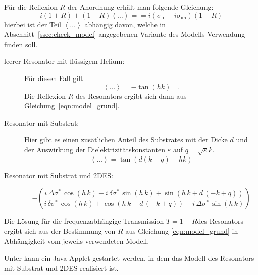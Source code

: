 Für die Reflexion $R$ der Anordnung erhält man folgende Gleichung:
\begin{equation}
\label{eqn:model_grund}
i(1 + R) + (1 - R) \left<\ldots\right> == i(\sigma_\text{re} - i \sigma_\text{im})(1 - R)
\end{equation}
hierbei ist der Teil $\left<\ldots\right>$ abhängig davon, welche in Abschnitt~\ref{ssec:check_model} angegebenen Variante des Modells Verwendung finden soll. 

\begin{description}
	\item[leerer Resonator mit flüssigem Helium:]
		Für diesen Fall gilt
		\begin{equation}
			\left<\ldots\right>=-\tan(h k)\quad.
		\end{equation}
		Die Reflexion $R$ des Resonators ergibt sich dann aus Gleichung~\eqref{eqn:model_grund}. 
	\item[Resonator mit Substrat:]
		Hier gibt es einen zusätlichen Anteil des Substrates mit der Dicke $d$ und der Auswirkung der Dielektrizitätskonstanten $\varepsilon$ auf $q=\sqrt{\varepsilon}k$. 
		\begin{equation}
			\left<\ldots\right>=\tan(d(k-q)-h k)
		\end{equation} 
	\item[Resonator mit Substrat und 2DES:]
		\begin{equation}
		-\left( \frac{i\,\Delta\sigma^\ast\,\cos(h\,k)+i\, \delta\sigma^\ast \,\sin(h\,k)+ 
		\sin (h\,k + d\,\left( -k + q \right) )}{i\,\delta\sigma^\ast\,\cos (h\,k) + \cos (h\,k + d\,\left( -k + q \right) ) - 
		i\,\Delta\sigma^\ast\,\sin (h\,k)} \right)
		\end{equation}
\end{description}

Die Lösung für die frequenzabhängige Transmission $T=1-R$des Resonators ergibt sich aus der Bestimmung von $R$ aus Gleichung \eqref{eqn:model_grund} in Abhängigkeit vom jeweils verwendeten Modell.

Unter  kann ein Java Applet gestartet werden, in dem das Modell des Resonators mit Substrat und 2DES realisiert ist. 
